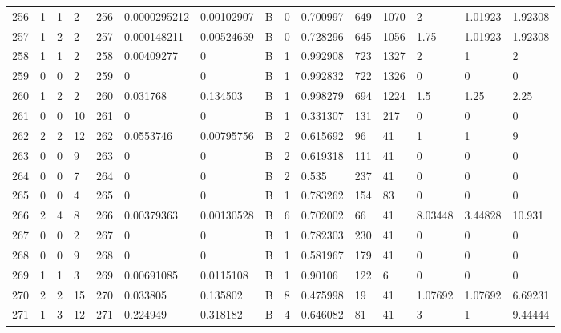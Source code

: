 \begin{latin}
\begin{longtable}{lllllllllllllll}
	256 & 1  & 1   & 2  & 256 & 0.0000295212   & 0.00102907     & B & 0  & 0.700997 & 649  & 1070 & 2       & 1.01923 & 1.92308 \\
	257 & 1  & 2   & 2  & 257 & 0.000148211    & 0.00524659     & B & 0  & 0.728296 & 645  & 1056 & 1.75    & 1.01923 & 1.92308 \\
	258 & 1  & 1   & 2  & 258 & 0.00409277     & 0              & B & 1  & 0.992908 & 723  & 1327 & 2       & 1       & 2       \\
	259 & 0  & 0   & 2  & 259 & 0              & 0              & B & 1  & 0.992832 & 722  & 1326 & 0       & 0       & 0       \\
	260 & 1  & 2   & 2  & 260 & 0.031768       & 0.134503       & B & 1  & 0.998279 & 694  & 1224 & 1.5     & 1.25    & 2.25    \\
	261 & 0  & 0   & 10 & 261 & 0              & 0              & B & 1  & 0.331307 & 131  & 217  & 0       & 0       & 0       \\
	262 & 2  & 2   & 12 & 262 & 0.0553746      & 0.00795756     & B & 2  & 0.615692 & 96   & 41   & 1       & 1       & 9       \\
	263 & 0  & 0   & 9  & 263 & 0              & 0              & B & 2  & 0.619318 & 111  & 41   & 0       & 0       & 0       \\
	264 & 0  & 0   & 7  & 264 & 0              & 0              & B & 2  & 0.535    & 237  & 41   & 0       & 0       & 0       \\
	265 & 0  & 0   & 4  & 265 & 0              & 0              & B & 1  & 0.783262 & 154  & 83   & 0       & 0       & 0       \\
	266 & 2  & 4   & 8  & 266 & 0.00379363     & 0.00130528     & B & 6  & 0.702002 & 66   & 41   & 8.03448 & 3.44828 & 10.931  \\
	267 & 0  & 0   & 2  & 267 & 0              & 0              & B & 1  & 0.782303 & 230  & 41   & 0       & 0       & 0       \\
	268 & 0  & 0   & 9  & 268 & 0              & 0              & B & 1  & 0.581967 & 179  & 41   & 0       & 0       & 0       \\
	269 & 1  & 1   & 3  & 269 & 0.00691085     & 0.0115108      & B & 1  & 0.90106  & 122  & 6    & 0       & 0       & 0       \\
	270 & 2  & 2   & 15 & 270 & 0.033805       & 0.135802       & B & 8  & 0.475998 & 19   & 41   & 1.07692 & 1.07692 & 6.69231 \\
	271 & 1  & 3   & 12 & 271 & 0.224949       & 0.318182       & B & 4  & 0.646082 & 81   & 41   & 3       & 1       & 9.44444 \\

\end{longtable}
\end{latin}
